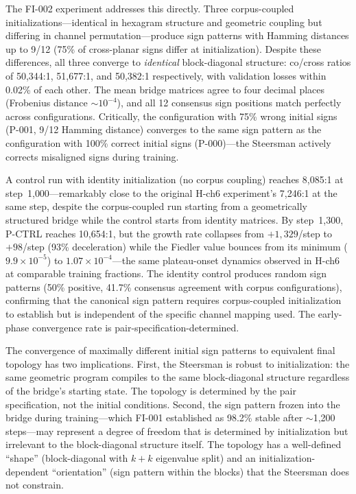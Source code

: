 The FI-002 experiment addresses this directly. Three corpus-coupled
initializations---identical in hexagram structure and geometric coupling
but differing in channel permutation---produce sign patterns with Hamming
distances up to 9/12 (75\% of cross-planar signs differ at initialization).
Despite these differences, all three converge to \emph{identical}
block-diagonal structure: co/cross ratios of 50{,}344:1,
51{,}677:1, and 50{,}382:1 respectively, with validation losses within
0.02\% of each other. The mean bridge matrices agree to four decimal
places (Frobenius distance ${\sim}10^{-4}$), and all 12 consensus sign
positions match perfectly across configurations. Critically, the
configuration with 75\% wrong initial signs (P-001, 9/12 Hamming
distance) converges to the same sign pattern as the configuration
with 100\% correct initial signs (P-000)---the Steersman actively
corrects misaligned signs during training.

A control run with identity initialization (no
corpus coupling) reaches 8{,}085:1 at step~1{,}000---remarkably close to the
original H-ch6 experiment's 7{,}246:1 at the same step, despite the corpus-coupled
run starting from a geometrically structured bridge while the control starts from
identity matrices. By step~1{,}300, P-CTRL reaches 10{,}654:1, but the growth rate
collapses from $+1{,}329$/step to $+98$/step (93\% deceleration) while the Fiedler
value bounces from its minimum ($9.9 \times 10^{-5}$) to $1.07 \times 10^{-4}$---the
same plateau-onset dynamics observed in H-ch6 at comparable training fractions.
The identity control produces random sign patterns (50\% positive, 41.7\%
consensus agreement with corpus configurations), confirming that the
canonical sign pattern requires corpus-coupled initialization to
establish but is independent of the specific channel mapping used.
The early-phase convergence rate is pair-specification-determined.

The convergence of maximally different initial sign patterns to equivalent
final topology has two implications. First, the Steersman is robust to
initialization: the same geometric program compiles to the same
block-diagonal structure regardless of the bridge's starting state. The
topology is determined by the pair specification, not the initial
conditions. Second, the sign pattern frozen into the bridge during
training---which FI-001 established as 98.2\% stable after $\sim$1{,}200
steps---may represent a degree of freedom that is determined by
initialization but irrelevant to the block-diagonal structure itself.
The topology has a well-defined ``shape'' (block-diagonal with $k{+}k$
eigenvalue split) and an initialization-dependent ``orientation'' (sign
pattern within the blocks) that the Steersman does not constrain.

